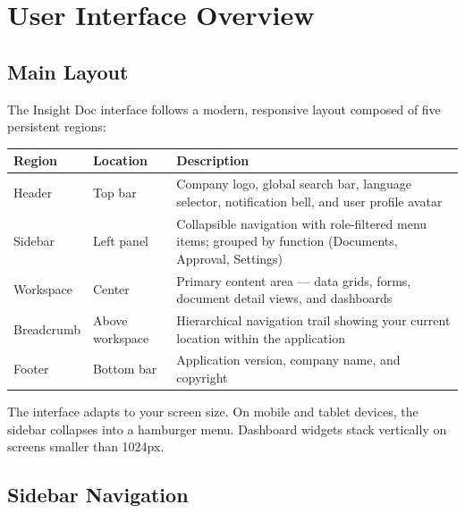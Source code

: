 \section{User Interface Overview}

\subsection{Main Layout}

The Insight Doc interface follows a modern, responsive layout
composed of five persistent regions:

\begin{tabularx}{\textwidth}{@{} l l X @{}}
  \toprule
  \textbf{Region} & \textbf{Location}
    & \textbf{Description} \\
  \midrule
  Header
    & Top bar
    & Company logo, global search bar, language selector,
      notification bell, and user profile avatar \\
  Sidebar
    & Left panel
    & Collapsible navigation with role-filtered menu items;
      grouped by function (Documents, Approval, Settings) \\
  Workspace
    & Center
    & Primary content area --- data grids, forms, document
      detail views, and dashboards \\
  Breadcrumb
    & Above workspace
    & Hierarchical navigation trail showing your current
      location within the application \\
  Footer
    & Bottom bar
    & Application version, company name, and copyright \\
  \bottomrule
\end{tabularx}

\begin{ugNote}
  The interface adapts to your screen size. On mobile and tablet
  devices, the sidebar collapses into a hamburger menu. Dashboard
  widgets stack vertically on screens smaller than 1024px.
\end{ugNote}

\subsection{Sidebar Navigation}

